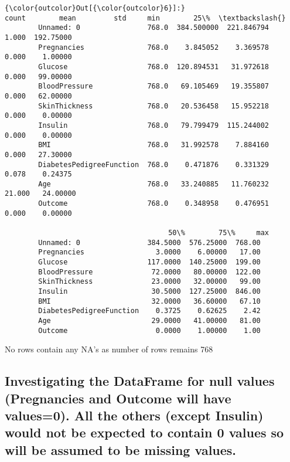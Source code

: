 \documentclass[11pt]{article}
\begin{document}
\begin{Verbatim}[commandchars=\\\{\}]
{\color{outcolor}Out[{\color{outcolor}6}]:}                           count        mean         std     min        25\%  \textbackslash{}
        Unnamed: 0                768.0  384.500000  221.846794   1.000  192.75000   
        Pregnancies               768.0    3.845052    3.369578   0.000    1.00000   
        Glucose                   768.0  120.894531   31.972618   0.000   99.00000   
        BloodPressure             768.0   69.105469   19.355807   0.000   62.00000   
        SkinThickness             768.0   20.536458   15.952218   0.000    0.00000   
        Insulin                   768.0   79.799479  115.244002   0.000    0.00000   
        BMI                       768.0   31.992578    7.884160   0.000   27.30000   
        DiabetesPedigreeFunction  768.0    0.471876    0.331329   0.078    0.24375   
        Age                       768.0   33.240885   11.760232  21.000   24.00000   
        Outcome                   768.0    0.348958    0.476951   0.000    0.00000   
        
                                       50\%        75\%     max  
        Unnamed: 0                384.5000  576.25000  768.00  
        Pregnancies                 3.0000    6.00000   17.00  
        Glucose                   117.0000  140.25000  199.00  
        BloodPressure              72.0000   80.00000  122.00  
        SkinThickness              23.0000   32.00000   99.00  
        Insulin                    30.5000  127.25000  846.00  
        BMI                        32.0000   36.60000   67.10  
        DiabetesPedigreeFunction    0.3725    0.62625    2.42  
        Age                        29.0000   41.00000   81.00  
        Outcome                     0.0000    1.00000    1.00  
\end{Verbatim}
            
    No rows contain any NA's as number of rows remains 768

    \subsection{Investigating the DataFrame for null values (Pregnancies and
Outcome will have values=0). All the others (except Insulin) would not
be expected to contain 0 values so will be assumed to be missing
values.}\label{investigating-the-dataframe-for-null-values-pregnancies-and-outcome-will-have-values0.-all-the-others-except-insulin-would-not-be-expected-to-contain-0-values-so-will-be-assumed-to-be-missing-values.}
\end{document}
